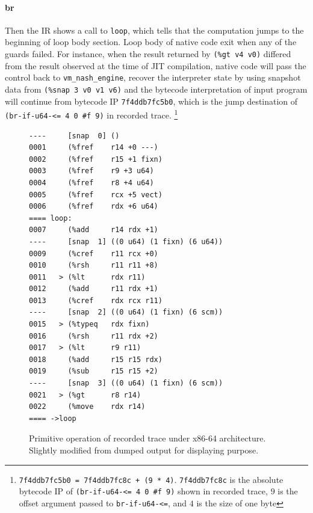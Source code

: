 \documentclass[preprint, 10pt]{sigplanconf}
\begin{document}
\paragraph{br} Then the IR shows a call to \texttt{loop}, which tells that the
computation jumps to the beginning of loop body section. Loop body of native
code exit when any of the guards failed.  For instance, when the result returned
by \texttt{(\%gt~v4~v0)} differed from the result observed at the time of JIT
compilation, native code will pass the control back to
\texttt{vm\_nash\_engine}, recover the interpreter state by using snapshot data
from \texttt{(\%snap~3~v0~v1~v6)} and the bytecode interpretation of input
program will continue from bytecode IP \texttt{7f4ddb7fc5b0}, which is the jump
destination of \texttt{(br-if-u64-<=~4~0~\#f~9)} in recorded trace.
\footnote{ \texttt{7f4ddb7fc5b0 = 7f4ddb7fc8c + (9 * 4)}.  \texttt{7f4ddb7fc8c}
  is the absolute bytecode IP of \texttt{(br-if-u64-<= 4 0 \#f 9)} shown in
  recorded trace, $9$ is the offset argument passed to \texttt{br-if-u64-<=},
  and $4$ is the size of one byte}


\begin{figure}
  \centering
  \small
\begin{verbatim}
----     [snap  0] ()
0001     (%fref    r14 +0 ---)
0002     (%fref    r15 +1 fixn)
0003     (%fref    r9 +3 u64)
0004     (%fref    r8 +4 u64)
0005     (%fref    rcx +5 vect)
0006     (%fref    rdx +6 u64)
==== loop:
0007     (%add     r14 rdx +1)
----     [snap  1] ((0 u64) (1 fixn) (6 u64))
0009     (%cref    r11 rcx +0)
0010     (%rsh     r11 r11 +8)
0011   > (%lt      rdx r11)
0012     (%add     r11 rdx +1)
0013     (%cref    rdx rcx r11)
----     [snap  2] ((0 u64) (1 fixn) (6 scm))
0015   > (%typeq   rdx fixn)
0016     (%rsh     r11 rdx +2)
0017   > (%lt      r9 r11)
0018     (%add     r15 r15 rdx)
0019     (%sub     r15 r15 +2)
----     [snap  3] ((0 u64) (1 fixn) (6 scm))
0021   > (%gt      r8 r14)
0022     (%move    rdx r14)
==== ->loop
\end{verbatim}
\caption{Primitive operation of recorded trace under x86-64
  architecture. Slightly modified from dumped output for displaying purpose.}
\label{fig:primops}
\end{figure}
\end{document}
